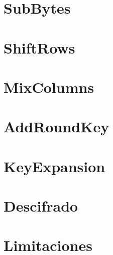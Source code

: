 

\section{SubBytes}


\section{ShiftRows}


\section{MixColumns}


\section{AddRoundKey}


\section{KeyExpansion}


\section{Descifrado}


\section{Limitaciones}






